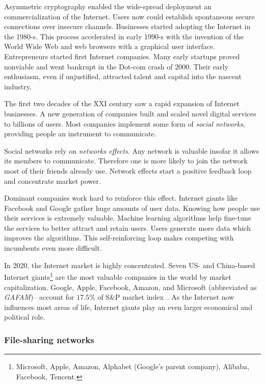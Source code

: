 Asymmetric cryptography enabled the wide-spread deployment an commercialization of the Internet.
Users now could establish spontaneous secure connections over insecure channels.
Businesses started adopting the Internet in the 1980-s.
This process accelerated in early 1990-s with the invention of the World Wide Web and web browsers with a graphical user interface.
Entrepreneurs started first Internet companies.
Many early startups proved nonviable and went bankrupt in the Dot-com crash of 2000.
Their early enthusiasm, even if unjustified, attracted talent and capital into the nascent industry.

The first two decades of the XXI century saw a rapid expansion of Internet businesses.
A new generation of companies built and scaled novel digital services to billions of users.
Most companies implement some form of \textit{social networks}, providing people an instrument to communicate.

Social networks rely on \textit{networks effects}.
Any network is valuable insofar it allows its members to communicate.
Therefore one is more likely to join the network most of their friends already use.
Network effects start a positive feedback loop and concentrate market power.

Dominant companies work hard to reinforce this effect.
Internet giants like Facebook and Google gather huge amounts of user data.
Knowing how people use their services is extremely valuable.
Machine learning algorithms help fine-tune the services to better attract and retain users.
Users generate more data which improves the algorithms.
This self-reinforcing loop makes competing with incumbents even more difficult.

In 2020, the Internet market is highly concentrated.
Seven US- and China-based Internet giants\footnote{Microsoft, Apple, Amazon, Alphabet (Google's parent company), Alibaba, Facebook, Tencent.} are the most valuable companies in the world by market capitalization.
Google, Apple, Facebook, Amazon, and Microsoft (abbreviated as \textit{GAFAM})-- account for $17.5$\% of S\&P market index~\cite{Levy2020}.
As the Internet now influences most areas of life, Internet giants play an even larger economical and political role.


\subsubsection*{File-sharing networks}

